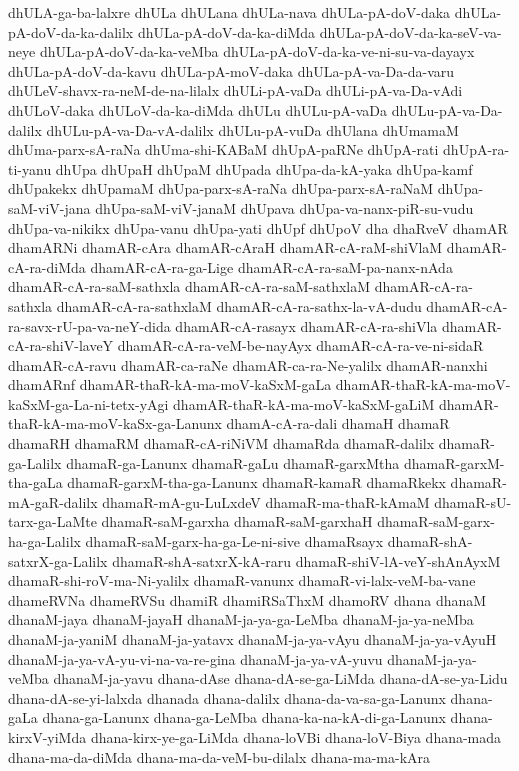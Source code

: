 {dhULA-ga-ba-lalxre
dhULa
dhULana
dhULa-nava
dhULa-pA-doV-daka
dhULa-pA-doV-da-ka-dalilx
dhULa-pA-doV-da-ka-diMda
dhULa-pA-doV-da-ka-seV-va-neye
dhULa-pA-doV-da-ka-veMba
dhULa-pA-doV-da-ka-ve-ni-su-va-dayayx
dhULa-pA-doV-da-kavu
dhULa-pA-moV-daka
dhULa-pA-va-Da-da-varu
dhULeV-shavx-ra-neM-de-na-lilalx
dhULi-pA-vaDa
dhULi-pA-va-Da-vAdi
dhULoV-daka
dhULoV-da-ka-diMda
dhULu
dhULu-pA-vaDa
dhULu-pA-va-Da-dalilx
dhULu-pA-va-Da-vA-dalilx
dhULu-pA-vuDa
dhUlana
dhUmamaM
dhUma-parx-sA-raNa
dhUma-shi-KABaM
dhUpA-paRNe
dhUpA-rati
dhUpA-ra-ti-yanu
dhUpa
dhUpaH
dhUpaM
dhUpada
dhUpa-da-kA-yaka
dhUpa-kamf
dhUpakekx
dhUpamaM
dhUpa-parx-sA-raNa
dhUpa-parx-sA-raNaM
dhUpa-saM-viV-jana
dhUpa-saM-viV-janaM
dhUpava
dhUpa-va-nanx-piR-su-vudu
dhUpa-va-nikikx
dhUpa-vanu
dhUpa-yati
dhUpf
dhUpoV
dha
dhaRveV
dhamAR
dhamARNi
dhamAR-cAra
dhamAR-cAraH
dhamAR-cA-raM-shiVlaM
dhamAR-cA-ra-diMda
dhamAR-cA-ra-ga-Lige
dhamAR-cA-ra-saM-pa-nanx-nAda
dhamAR-cA-ra-saM-sathxla
dhamAR-cA-ra-saM-sathxlaM
dhamAR-cA-ra-sathxla
dhamAR-cA-ra-sathxlaM
dhamAR-cA-ra-sathx-la-vA-dudu
dhamAR-cA-ra-savx-rU-pa-va-neY-dida
dhamAR-cA-rasayx
dhamAR-cA-ra-shiVla
dhamAR-cA-ra-shiV-laveY
dhamAR-cA-ra-veM-be-nayAyx
dhamAR-cA-ra-ve-ni-sidaR
dhamAR-cA-ravu
dhamAR-ca-raNe
dhamAR-ca-ra-Ne-yalilx
dhamAR-nanxhi
dhamARnf
dhamAR-thaR-kA-ma-moV-kaSxM-gaLa
dhamAR-thaR-kA-ma-moV-kaSxM-ga-La-ni-tetx-yAgi
dhamAR-thaR-kA-ma-moV-kaSxM-gaLiM
dhamAR-thaR-kA-ma-moV-kaSx-ga-Lanunx
dhamA-cA-ra-dali
dhamaH
dhamaR
dhamaRH
dhamaRM
dhamaR-cA-riNiVM
dhamaRda
dhamaR-dalilx
dhamaR-ga-Lalilx
dhamaR-ga-Lanunx
dhamaR-gaLu
dhamaR-garxMtha
dhamaR-garxM-tha-gaLa
dhamaR-garxM-tha-ga-Lanunx
dhamaR-kamaR
dhamaRkekx
dhamaR-mA-gaR-dalilx
dhamaR-mA-gu-LuLxdeV
dhamaR-ma-thaR-kAmaM
dhamaR-sU-tarx-ga-LaMte
dhamaR-saM-garxha
dhamaR-saM-garxhaH
dhamaR-saM-garx-ha-ga-Lalilx
dhamaR-saM-garx-ha-ga-Le-ni-sive
dhamaRsayx
dhamaR-shA-satxrX-ga-Lalilx
dhamaR-shA-satxrX-kA-raru
dhamaR-shiV-lA-veY-shAnAyxM
dhamaR-shi-roV-ma-Ni-yalilx
dhamaR-vanunx
dhamaR-vi-lalx-veM-ba-vane
dhameRVNa
dhameRVSu
dhamiR
dhamiRSaThxM
dhamoRV
dhana
dhanaM
dhanaM-jaya
dhanaM-jayaH
dhanaM-ja-ya-ga-LeMba
dhanaM-ja-ya-neMba
dhanaM-ja-yaniM
dhanaM-ja-yatavx
dhanaM-ja-ya-vAyu
dhanaM-ja-ya-vAyuH
dhanaM-ja-ya-vA-yu-vi-na-va-re-gina
dhanaM-ja-ya-vA-yuvu
dhanaM-ja-ya-veMba
dhanaM-ja-yavu
dhana-dAse
dhana-dA-se-ga-LiMda
dhana-dA-se-ya-Lidu
dhana-dA-se-yi-lalxda
dhanada
dhana-dalilx
dhana-da-va-sa-ga-Lanunx
dhana-gaLa
dhana-ga-Lanunx
dhana-ga-LeMba
dhana-ka-na-kA-di-ga-Lanunx
dhana-kirxV-yiMda
dhana-kirx-ye-ga-LiMda
dhana-loVBi
dhana-loV-Biya
dhana-mada
dhana-ma-da-diMda
dhana-ma-da-veM-bu-dilalx
dhana-ma-ma-kAra
}
